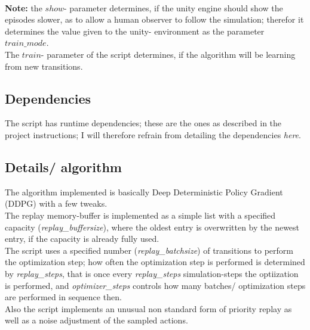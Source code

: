 \documentclass[a4paper]{article}
\begin{document}
\normalsize
\\
\textbf{Note:} the $show$- parameter determines, if the unity engine should
show the episodes slower, as to allow a human observer to follow the simulation; therefor
it determines the value given to the unity- environment as the parameter $train\_mode$.
\\
The $train$- parameter of the script determines, if the algorithm will be learning
from new transitions.

\subsection{Dependencies}
The script has runtime dependencies; these are the ones as described in the
project instructions; I will therefore refrain from detailing the dependencies \textit{here}.

\subsection{Details/ algorithm}
The algorithm implemented is basically Deep Deterministic Policy Gradient (DDPG)
with a few tweaks.
\\
The replay memory-buffer is implemented as a simple list with a specified capacity (\textit{replay\_buffersize}),
where the oldest entry is overwritten by the newest entry, if the capacity is already
fully used.
\\
The script uses a specified number (\textit{replay\_batchsize}) of transitions
to perform the optimization step; how often the optimization step is performed
is determined by \textit{replay\_steps}, that is once every \textit{replay\_steps}
simulation-steps the optiization is performed, and \textit{optimizer\_steps}
controls how many batches/ optimization steps are performed in sequence then.
\\
Also the script implements an unusual non standard form of priority replay
as well as a noise adjustment of the sampled actions.
\end{document}

